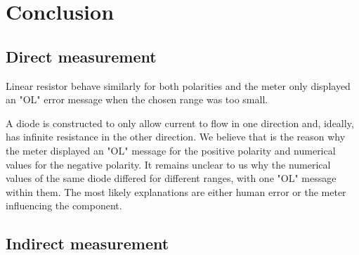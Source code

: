 \section{Conclusion}
\subsection{Direct measurement}

Linear resistor behave similarly for both polarities and the meter only displayed an "OL" error message when the chosen range was too small. 

A diode is constructed to only allow current to flow in one direction and, ideally, has infinite resistance in the other direction. We believe that is the reason why the meter displayed an "OL" message for the positive polarity and numerical values for the negative polarity. It remains unclear to us why the numerical values of the same diode differed for different ranges, with one "OL" message within them. The most likely explanations are either human error or the meter influencing the component.

\subsection{Indirect measurement}

